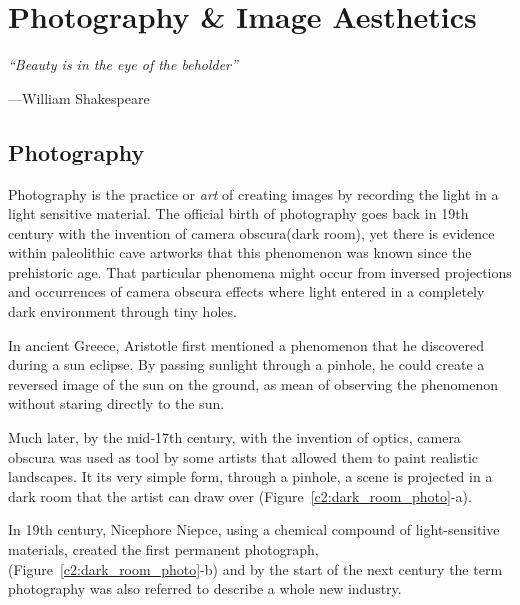 \chapter{Photography \& Image Aesthetics}
\label{c2:photography_aesthetics}
\thispagestyle{empty}
\epigraph{\itshape ``Beauty is in the eye of the beholder''}
{---William Shakespeare}


\section{Photography}

Photography is the practice or \textit{art} of creating images by recording the light in a light sensitive material. The official birth of photography goes back in 19th century with the invention of camera obscura(dark room), yet there is evidence within paleolithic cave artworks that this phenomenon was known  since the prehistoric age. That particular phenomena might occur from inversed projections and occurrences of camera obscura effects where light entered in a completely dark environment through tiny holes.

In ancient Greece, Aristotle first mentioned a phenomenon that he discovered during a sun eclipse. By passing sunlight through a pinhole, he could create a reversed image of the sun on the ground, as mean of observing the phenomenon without staring directly to the sun.

Much later, by the mid-17th century, with the invention of optics, camera obscura was used as tool by some artists that allowed them to paint realistic landscapes. It its very simple form, through a pinhole, a scene is projected in a dark room that the artist can draw over (Figure~\ref{c2:dark_room_photo}-a).

In 19th century, Nicephore Niepce, using a chemical compound of light-sensitive materials, created the first permanent photograph, (Figure~\ref{c2:dark_room_photo}-b) and by the start of the next century the term photography was also referred to describe a whole new industry.

